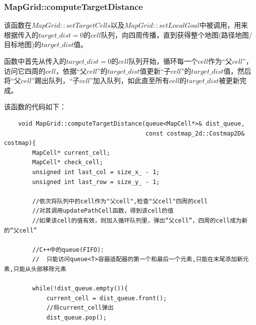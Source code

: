 \documentclass[9pt, oneside]{book}
\begin{document}
\subsubsection{MapGrid::computeTargetDistance}

该函数在$MapGrid::setTargetCells$以及$MapGrid::setLocalGoal$中被调用，用来根据传入的$target\_dist=0$的$cell$队列，向四周传播，直到获得整个地图(路径地图/目标地图)的$target\_dist$值。

函数中首先从传入的$target\_dist=0$的$cell$队列开始，循环每一个$cell$作为“父$cell$”，访问它四周的$cell$，依据“父$cell$”的$target\_dist$值更新“子$cell$”的$target\_dist$值，然后将“父$cell$”踢出队列，“子$cell$”加入队列，如此直至所有$cell$的$target\_dist$被更新完成。

该函数的代码如下：

\footnotesize
\begin{verbatim}
    void MapGrid::computeTargetDistance(queue<MapCell*>& dist_queue,
                                        const costmap_2d::Costmap2D& costmap){
        MapCell* current_cell;
        MapCell* check_cell;
        unsigned int last_col = size_x_ - 1;
        unsigned int last_row = size_y_ - 1;
    
        //依次将队列中的cell作为"父cell",检查"父cell"四周的cell
        //对其调用updatePathCell函数，得到该cell的值
        //如果该cell的值有效，则加入循环队列里，弹出“父cell”，四周的cell成为新的“父cell”
    
        //C++中的queue(FIFO): 
        //  只能访问queue<T>容器适配器的第一个和最后一个元素,只能在末尾添加新元素,只能从头部移除元素
    
        while(!dist_queue.empty()){
            current_cell = dist_queue.front();
            //将current_cell弹出
            dist_queue.pop();
        

\end{verbatim}
\end{document}
